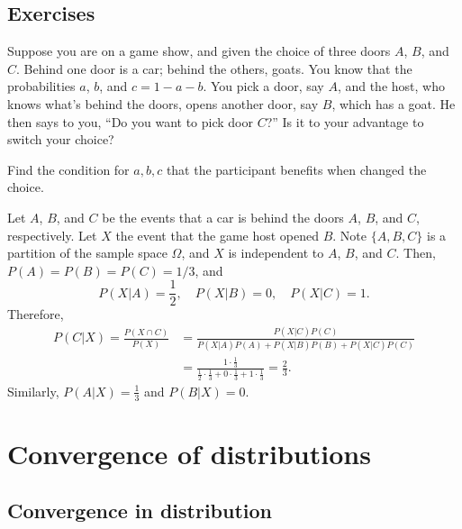 \documentclass{../../large}
\begin{document}
\section*{Exercises}

\begin{prb}
Suppose you are on a game show, and given the choice of three doors $A$, $B$, and $C$.
Behind one door is a car; behind the others, goats.
You know that the probabilities $a$, $b$, and $c=1-a-b$.
You pick a door, say $A$, and the host, who knows what's behind the doors, opens another door, say $B$, which has a goat.
He then says to you, ``Do you want to pick door $C$?''
Is it to your advantage to switch your choice?
\begin{parts}
\item Find the condition for $a,b,c$ that the participant benefits when changed the choice.
\end{parts}
\end{prb}
\begin{pf}
Let $A$, $B$, and $C$ be the events that a car is behind the doors $A$, $B$, and $C$, respectively.
Let $X$ the event that the game host opened $B$.
Note $\{A,B,C\}$ is a partition of the sample space $\Omega$, and $X$ is independent to $A$, $B$, and $C$.
Then, $P(A)=P(B)=P(C)=1/3$, and
\[P(X|A)=\frac12,\quad P(X|B)=0,\quad P(X|C)=1.\]
Therefore,
\begin{align*}
P(C|X)=\frac{P(X\cap C)}{P(X)}
&=\frac{P(X|C)P(C)}{P(X|A)P(A)+P(X|B)P(B)+P(X|C)P(C)}\\
&=\frac{1\cdot \frac13}{\frac12\cdot\frac13+0\cdot\frac13+1\cdot\frac13}=\frac23.
\end{align*}
Similarly, $P(A|X)=\frac13$ and $P(B|X)=0$.
\end{pf}










\chapter{Convergence of distributions}











\section{Convergence in distribution}
\end{document}
